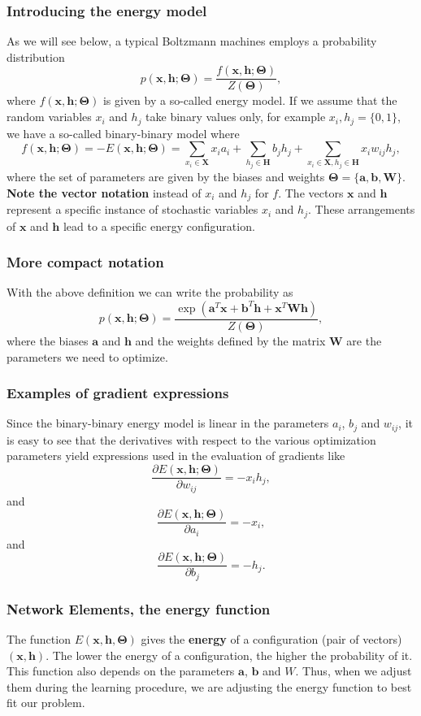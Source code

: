 \documentclass{beamer}
\begin{document}
\begin{frame}
\frametitle{Introducing the energy model}

As we will see below, a typical Boltzmann machines employs a probability distribution
\[
p(\bm{x},\bm{h};\bm{\Theta}) = \frac{f(\bm{x},\bm{h};\bm{\Theta})}{Z(\bm{\Theta})},
\]
where $f(\bm{x},\bm{h};\bm{\Theta})$ is given by a so-called energy model. If we assume that the random variables $x_i$ and $h_j$ take binary values only, for example $x_i,h_j=\{0,1\}$, we have a so-called binary-binary model where
\[
f(\bm{x},\bm{h};\bm{\Theta})=-E(\bm{x}, \bm{h};\bm{\Theta}) = \sum_{x_i\in \bm{X}} x_i a_i+\sum_{h_j\in \bm{H}} b_j h_j + \sum_{x_i\in \bm{X},h_j\in\bm{H}} x_i w_{ij} h_j,
\]
where the set of parameters are given by the biases and weights $\bm{\Theta}=\{\bm{a},\bm{b},\bm{W}\}$.
\textbf{Note the vector notation} instead of $x_i$ and $h_j$ for $f$. The vectors $\bm{x}$ and $\bm{h}$ represent a specific instance of stochastic variables $x_i$ and $h_j$. These arrangements of $\bm{x}$ and $\bm{h}$ lead to a specific energy configuration.
\end{frame}

\begin{frame}
\frametitle{More compact notation}

With the above definition we can write the probability as
\[
p(\bm{x},\bm{h};\bm{\Theta}) = \frac{\exp{(\bm{a}^T\bm{x}+\bm{b}^T\bm{h}+\bm{x}^T\bm{W}\bm{h})}}{Z(\bm{\Theta})},
\]
where the biases $\bm{a}$ and $\bm{h}$ and the weights defined by the matrix $\bm{W}$ are the parameters we need to optimize.
\end{frame}

\begin{frame}
\frametitle{Examples of gradient expressions}

Since the binary-binary energy model is linear in the parameters $a_i$, $b_j$ and
$w_{ij}$, it is easy to see that the derivatives with respect to the
various optimization parameters yield expressions used in the
evaluation of gradients like
\[
\frac{\partial E(\bm{x}, \bm{h};\bm{\Theta})}{\partial w_{ij}}=-x_ih_j,
\]
and
\[
\frac{\partial E(\bm{x}, \bm{h};\bm{\Theta})}{\partial a_i}=-x_i,
\]
and
\[
\frac{\partial E(\bm{x}, \bm{h};\bm{\Theta})}{\partial b_j}=-h_j.
\]
\end{frame}

\begin{frame}
\frametitle{Network Elements, the energy function}

The function $E(\bm{x},\bm{h},\bm{\Theta})$ gives the \textbf{energy} of a
configuration (pair of vectors) $(\bm{x}, \bm{h})$. The lower
the energy of a configuration, the higher the probability of it. This
function also depends on the parameters $\bm{a}$, $\bm{b}$ and
$W$. Thus, when we adjust them during the learning procedure, we are
adjusting the energy function to best fit our problem.
\end{frame}
\end{document}
